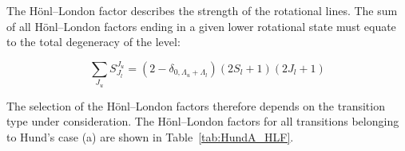 


\par

The H\"{o}nl--London factor describes the strength of the rotational lines.
The sum of all H\"{o}nl--London factors ending in a given lower rotational state must equate to the total degeneracy of the level:

\begin{equation}
 \sum_{J_u} S^{J_u}_{J_l} = \left ( 2 - \delta_{0,\Lambda_u+\Lambda_l} \right ) \left ( 2 S_l + 1 \right ) \left ( 2 J_l + 1 \right )
\end{equation}

The selection of the H\"{o}nl--London factors therefore depends on the transition type under consideration.
The H\"{o}nl--London factors for all transitions belonging to Hund's case (a) are shown in Table~\ref{tab:HundA_HLF}.

